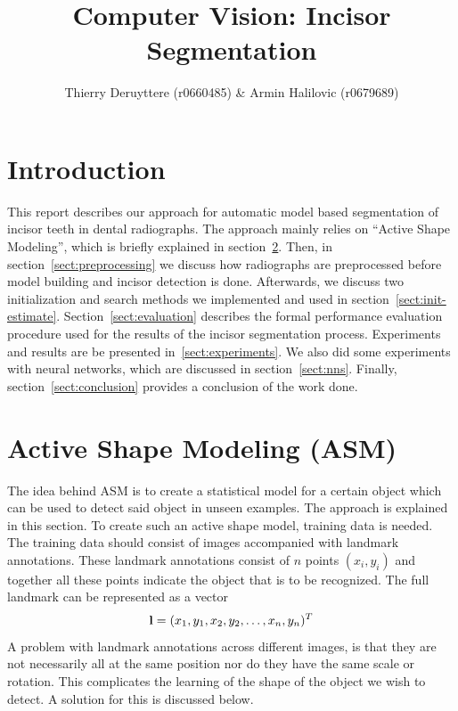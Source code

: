 \documentclass[a4paper]{article}
\title{Computer Vision: Incisor Segmentation}
\author{Thierry Deruyttere (r0660485) \& Armin Halilovic (r0679689)}
\begin{document}
\maketitle



\section{Introduction}
This report describes our approach for automatic model based segmentation of incisor teeth in dental radiographs.
The approach mainly relies on ``Active Shape Modeling'', which is briefly explained in section~\ref{sect:asm}.
Then, in section~\ref{sect:preprocessing} we discuss how radiographs are preprocessed before model building and incisor detection is done.
Afterwards, we discuss two initialization and search methods we implemented and used in section~\ref{sect:init-estimate}.
Section~\ref{sect:evaluation} describes the formal performance evaluation procedure used for the results of the incisor segmentation process.
Experiments and results are be presented in~\ref{sect:experiments}.
We also did some experiments with neural networks, which are discussed in section~\ref{sect:nns}.
Finally, section~\ref{sect:conclusion} provides a conclusion of the work done.



\section{Active Shape Modeling (ASM)}
\label{sect:asm}
The idea behind ASM is to create a statistical model for a certain object which can be used to detect said object in unseen examples. 
The approach is explained in this section.
To create such an active shape model, training data is needed. 
The training data should consist of images accompanied with landmark annotations.
These landmark annotations consist of $n$ points $({x_i, y_i})$ and together all these points indicate the object that is to be recognized.
The full landmark can be represented as a vector 
\begin{equation}
\textnormal{\textbf{l}} = (x_1, y_1, x_2, y_2, \ldots, x_n, y_n)^T
\end{equation}
A problem with landmark annotations across different images, is that they are not necessarily all at the same position nor do they have the same scale or rotation.
This complicates the learning of the shape of the object we wish to detect.
A solution for this is discussed below.
\end{document}
